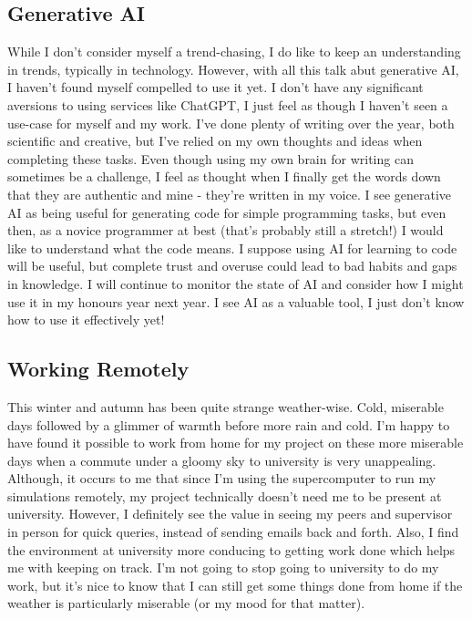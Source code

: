 \documentclass[11pt]{article}
\begin{document}
\subsection{Generative AI}

While I don't consider myself a trend-chasing, I do like to keep an understanding in trends, typically in technology. However, with all this talk abut generative AI, I haven't found myself compelled to use it yet. I don't have any significant aversions to using services like ChatGPT, I just feel as though I haven't seen a use-case for myself and my work. I've done plenty of writing over the year, both scientific and creative, but I've relied on my own thoughts and ideas when completing these tasks. Even though using my own brain for writing can sometimes be a challenge, I feel as thought when I finally get the words down that they are authentic and mine - they're written in my voice. I see generative AI as being useful for generating code for simple programming tasks, but even then, as a novice programmer at best (that's probably still a stretch!) I would like to understand what the code means. I suppose using AI for learning to code will be useful, but complete trust and overuse could lead to bad habits and gaps in knowledge. I will continue to monitor the state of AI and consider how I might use it in my honours year next year. I see AI as a valuable tool, I just don't know how to use it effectively yet!

\subsection{Working Remotely}

This winter and autumn has been quite strange weather-wise. Cold, miserable days followed by a glimmer of warmth before more rain and cold. I'm happy to have found it possible to work from home for my project on these more miserable days when a commute under a gloomy sky to university is very unappealing. Although, it occurs to me that since I'm using the supercomputer to run my simulations remotely, my project technically doesn't need me to be present at university. However, I definitely see the value in seeing my peers and supervisor in person for quick queries, instead of sending emails back and forth. Also, I find the environment at university more conducing to getting work done which helps me with keeping on track. I'm not going to stop going to university to do my work, but it's nice to know that I can still get some things done from home if the weather is particularly miserable (or my mood for that matter). 
\end{document}
